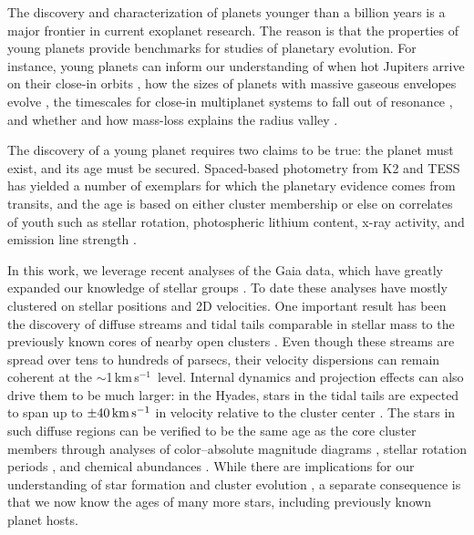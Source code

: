 \documentclass[12pt,twocolumn]{aastex63}
\newcommand{\kms}{\,km\,s$^{-1}$}
\newcommand{\mkms}{{\rm \,km\,s^{-1}}}  %
\begin{document}
The discovery and characterization of planets younger than a billion
years is a major frontier in current exoplanet research.  The reason
is that the properties of young planets provide benchmarks for studies
of planetary evolution.  For instance, young planets can inform our
understanding of when hot Jupiters arrive on their close-in orbits
\citep{dawson_johnson_2018}, how the sizes of planets with massive
gaseous envelopes evolve \citep{rizzuto_tess_2020}, the timescales for
close-in multiplanet systems to fall out of resonance
\citep{izidoro_breaking_2017,arevalo_stability_2022,goldberg_architectures_2022}, and
whether and how mass-loss explains the radius valley
\citep{lopez_how_2012,Owen_Wu_2013,Fulton_et_al_2017,ginzburg_corepowered_2018,lee_primordial_2021}.

The discovery of a young planet requires two claims to be true: the
planet must exist, and its age must be secured.  Spaced-based
photometry from K2 and TESS has yielded a number of exemplars for
which the planetary evidence comes from transits, and the age is based
on either cluster membership
\citep{Mann_et_al_2017,david_four_2019,newton_tess_2019,bouma_cluster_2020,nardiello_pathosII_2020}
or else on correlates of youth such as stellar rotation, photospheric
lithium content, x-ray activity, and emission line strength
\citep{zhou_2021_tois,hedges_toi-2076_2021}.

In this work, we leverage recent analyses of the Gaia data, which have
greatly expanded our knowledge of stellar groups
\citep[{e.g.},][]{CantatGaudin2018a,KounkelCovey2019,Kerr2021}.  To
date these analyses have mostly clustered on stellar positions and 2D
velocities.  One important result has been the discovery of diffuse
streams and tidal tails comparable in stellar mass to the previously
known cores of nearby open clusters
\citep{meingast_psceri_2019,Meingast2021,gagne_number_2021}.  Even
though these streams are spread over tens to hundreds of parsecs,
their velocity dispersions can remain coherent at the $\sim$1\kms\
level.  Internal dynamics and projection effects can also drive them
to be much larger: in the Hyades, stars in the tidal tails are
expected to span up to $\pm 40\mkms$ in velocity relative to the
cluster center \citep{jerabkova_800_2021}.  The stars in such diffuse
regions can be verified to be the same age as the core cluster members
through analyses of color--absolute magnitude diagrams
\citep{KounkelCovey2019}, stellar rotation periods
\citep{curtis_tess_2019,bouma_2021_ngc2516}, and chemical abundances
\citep{hawkins_2020}.  While there are implications for our
understanding of star formation and cluster evolution
\citep{dinnbier_tidal_2020}, a separate consequence is that we now
know the ages of many more stars, including previously known planet
hosts.
\end{document}
